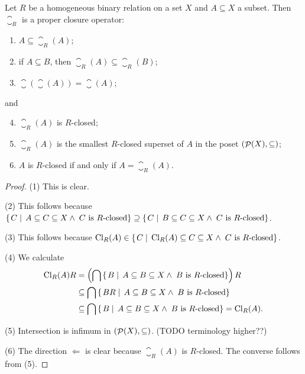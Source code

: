 \begin{proposition} \label{prop:RclosureIsClosure}
Let $R$ be a homogeneous binary relation on a set $X$ and $A\subseteq X$ a subset. Then $\closure_R$ is a proper closure operator:
\begin{enumerate}
\item $A \subseteq \closure_R(A)$;
\item if $A\subseteq B$, then $\closure_R(A) \subseteq \closure_R(B)$;
\item $\closure(\closure(A)) = \closure(A)$;
\end{enumerate}
and
\begin{enumerate} \setcounter{enumi}{3}
\item $\closure_R(A)$ is $R$-closed;
\item $\closure_R(A)$ is the smallest $R$-closed superset of $A$ in the poset $\left( \mathop{\mathcal{P}}(X),\subseteq \right)$;
\item $A$ is $R$-closed \textup{if and only if} $A = \closure_R(A)$.
\end{enumerate}
\end{proposition}
\begin{proof}
(1) This is clear.

(2) This follows because $\left\{\left. C \;\right|\; A \subseteq C \subseteq X \land \;\text{$C$ is $R$-closed} \right\} \supseteq \left\{\left. C \;\right|\; B \subseteq C \subseteq X \land \;\text{$C$ is $R$-closed} \right\}$.

(3) This follows because $\operatorname{Cl}_R(A) \in \left\{\left. C \;\right|\; \operatorname{Cl}_R(A) \subseteq C \subseteq X \land \;\text{$C$ is $R$-closed} \right\}$.

(4) We calculate
\begin{align*}
\operatorname{Cl}_R(A)R &= \left(\bigcap \left\{\left. B \;\right|\; A \subseteq B \subseteq X \land \;\text{$B$ is $R$-closed} \right\}\right)R \\
&\subseteq \bigcap \left\{\left. BR \;\right|\; A \subseteq B \subseteq X \land \;\text{$B$ is $R$-closed} \right\} \\
&\subseteq \bigcap \left\{\left. B \;\right|\; A \subseteq B \subseteq X \land \;\text{$B$ is $R$-closed} \right\} = \operatorname{Cl}_R(A).
\end{align*}

(5) Intersection is infimum in $\left( \mathop{\mathcal{P}}(X),\subseteq \right)$. (TODO terminology higher??)

(6) The direction $\Leftarrow$ is clear because $\closure_R(A)$ is $R$-closed. The converse follows from (5).
\end{proof}

